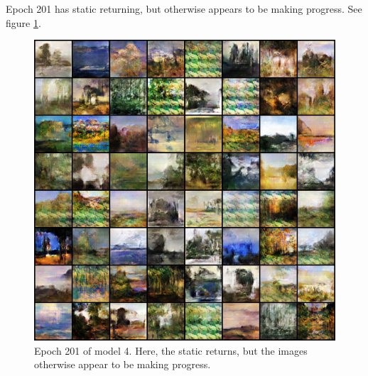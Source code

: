 \documentclass[11pt,letterpaper]{article}
\begin{document}
				Epoch 201 has static returning, but otherwise appears to be making progress.
				See figure \ref{fig:wa64:epoch201generator}.
				\begin{figure}
					\centering
					\includegraphics[width=1.0\linewidth]{results/model4/epoch201_generator}
					\caption{Epoch 201 of model 4. Here, the static returns, but the images otherwise appear to be making progress.}
					\label{fig:wa64:epoch201generator}
				\end{figure}
\end{document}
